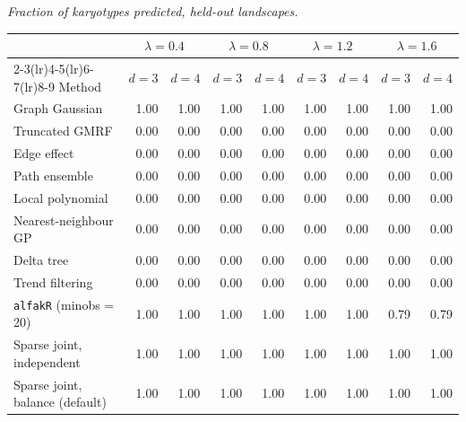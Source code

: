 \par\medskip\noindent\begin{minipage}{\linewidth}
\textit{Fraction of karyotypes predicted, held-out landscapes.}
\begin{center}
\footnotesize
\setlength{\tabcolsep}{3.5pt}
\begin{tabular}{l*{8}{r}}
\toprule
 & \multicolumn{2}{c}{$\lambda=0.4$} & \multicolumn{2}{c}{$\lambda=0.8$} & \multicolumn{2}{c}{$\lambda=1.2$} & \multicolumn{2}{c}{$\lambda=1.6$} \\
\cmidrule(lr){2-3}\cmidrule(lr){4-5}\cmidrule(lr){6-7}\cmidrule(lr){8-9}
Method & $d=3$ & $d=4$ & $d=3$ & $d=4$ & $d=3$ & $d=4$ & $d=3$ & $d=4$ \\
\midrule
Graph Gaussian & 1.00 & 1.00 & 1.00 & 1.00 & 1.00 & 1.00 & 1.00 & 1.00 \\
Truncated GMRF & 0.00 & 0.00 & 0.00 & 0.00 & 0.00 & 0.00 & 0.00 & 0.00 \\
Edge effect & 0.00 & 0.00 & 0.00 & 0.00 & 0.00 & 0.00 & 0.00 & 0.00 \\
Path ensemble & 0.00 & 0.00 & 0.00 & 0.00 & 0.00 & 0.00 & 0.00 & 0.00 \\
Local polynomial & 0.00 & 0.00 & 0.00 & 0.00 & 0.00 & 0.00 & 0.00 & 0.00 \\
Nearest-neighbour GP & 0.00 & 0.00 & 0.00 & 0.00 & 0.00 & 0.00 & 0.00 & 0.00 \\
Delta tree & 0.00 & 0.00 & 0.00 & 0.00 & 0.00 & 0.00 & 0.00 & 0.00 \\
Trend filtering & 0.00 & 0.00 & 0.00 & 0.00 & 0.00 & 0.00 & 0.00 & 0.00 \\
\texttt{alfakR} (minobs = 20) & 1.00 & 1.00 & 1.00 & 1.00 & 1.00 & 1.00 & 0.79 & 0.79 \\
Sparse joint, independent & 1.00 & 1.00 & 1.00 & 1.00 & 1.00 & 1.00 & 1.00 & 1.00 \\
Sparse joint, balance (default) & 1.00 & 1.00 & 1.00 & 1.00 & 1.00 & 1.00 & 1.00 & 1.00 \\
\bottomrule
\end{tabular}
\end{center}
\end{minipage}

